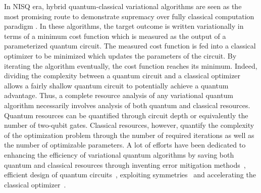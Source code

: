 \documentclass[aps, prx, reprint, superscriptaddress]{revtex4-2}
\begin{document}
In NISQ era, hybrid quantum-classical variational algorithms are seen as the most promising route to demonstrate supremacy over fully classical computation paradigm \cite{peruzzo2014variational,cerezo_variational_2021}. 
In these algorithms, the target outcome is written variationally in terms of a minimum cost function which is measured as the output of a parameterized quantum circuit. 
The measured cost function is fed into a classical optimizer to be minimized which updates the parameters of the circuit. By iterating the algorithm eventually, the cost function reaches its minimum. Indeed, dividing the complexity between a quantum circuit and a classical optimizer allows a fairly shallow quantum circuit to potentially achieve a quantum advantage. Thus, a complete resource analysis of any variational quantum algorithm necessarily involves analysis of both quantum and classical resources. 
Quantum resources can be 
quantified through circuit depth or equivalently the number of two-qubit gates. Classical resources, however, quantify the complexity of the optimization problem through the number of required iterations as well as the number of optimizable parameters. A lot of efforts have been dedicated to enhancing the efficiency of variational quantum algorithms by saving both quantum and classical resources through inventing error mitigation methods~\cite{temme_error_2017,sagastizabal2019experimental,ravi2022vaqem,PhysRevX.8.031027,qin2022overview}, efficient design of quantum circuits~\cite{liu2019variational,huang2022robust}, exploiting symmetries~\cite{Kazuhiro2020Symmetry,gard2020efficient,Lyu2023symmetry,han2023multi} and accelerating the classical optimizer~\cite{lyu2020accelerated,alam2020accelerating,sweke2020stochastic,muller2022accelerating}. 
\end{document}
